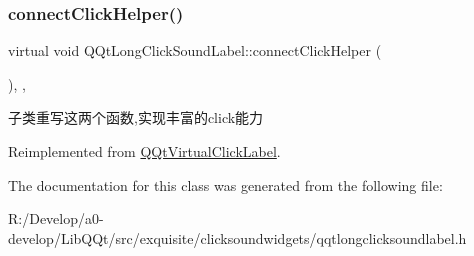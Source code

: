 \subsubsection{\texorpdfstring{connect\+Click\+Helper()}{connectClickHelper()}}
{\footnotesize\ttfamily virtual void Q\+Qt\+Long\+Click\+Sound\+Label\+::connect\+Click\+Helper (\begin{DoxyParamCaption}{ }\end{DoxyParamCaption})\hspace{0.3cm}{\ttfamily [inline]}, {\ttfamily [protected]}, {\ttfamily [virtual]}}

子类重写这两个函数,实现丰富的click能力 

Reimplemented from \mbox{\hyperlink{class_q_qt_virtual_click_label_a6e008887a4f2d5287e329a53caf8222c}{Q\+Qt\+Virtual\+Click\+Label}}.



The documentation for this class was generated from the following file\+:\begin{DoxyCompactItemize}
\item 
R\+:/\+Develop/a0-\/develop/\+Lib\+Q\+Qt/src/exquisite/clicksoundwidgets/qqtlongclicksoundlabel.\+h\end{DoxyCompactItemize}
